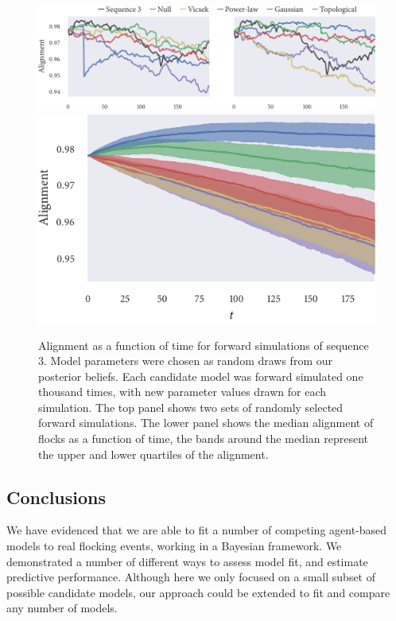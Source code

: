 \begin{figure}[tbp]
  \includegraphics{alignment/alignment_single_3.pdf}\vspace{1em}\\
  \includegraphics{alignment/alignment_ensemble_3.pdf}
  \caption{Alignment as a function of time for forward simulations of sequence
    3. Model parameters were chosen as random draws from our posterior
    beliefs. Each candidate model was forward simulated one thousand times,
    with new parameter values drawn for each simulation. The top panel shows two
    sets of randomly selected forward simulations. The lower panel shows the
    median alignment of flocks as a function of time, the bands around the
    median represent the upper and lower quartiles of the alignment.}
  \label{fig:checks_seq3}
\end{figure}

\subsection*{Conclusions}

We have evidenced that we are able to fit a number of competing agent-based
models to real flocking events, working in a Bayesian framework. We
demonstrated a number of different ways to assess model fit, and estimate
predictive performance. Although here we only focused on a small subset of
possible candidate models, our approach could be extended to fit and compare
any number of models.

